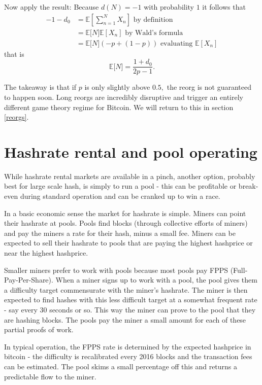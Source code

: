 \documentclass{article}%
\begin{document}
Now apply the result: Because $d(N)=-1$ with probability $1$ it follows
that
\begin{align*}
-1-d_{0}  &  =\mathbb{E}\left[  \sum_{n=1}^{N}X_{n}\right]  \text{  by
definition}\\
&  =\mathbb{E[}N\mathbb{]E}\left[  X_{n}\right]  \text{  by Wald's formula}\\
&  =\mathbb{E[}N\mathbb{]}(-p+(1-p))\text{ evaluating }\mathbb{E}\left[
X_{n}\right]
\end{align*}
that is
\begin{equation}
\mathbb{E[}N\mathbb{]=}\frac{1+d_{0}}{2p-1} .\label{wf}%
\end{equation}


The takeaway is that if $p$ is only slightly above $0.5,$ the reorg is not
guaranteed to happen soon.  Long reorgs are incredibly disruptive and trigger
an entirely different game theory regime for Bitcoin.  We will return to this
in section \ref{reorgs}.

\section{Hashrate rental and pool operating\label{erntal}}

While hashrate rental markets are available in a pinch, another option, probably best for large
scale hash, is simply to run a pool - this can be profitable or break-even
during standard operation and can be cranked up to win a race.

In a basic economic sense the market for hashrate is simple.  Miners can
point their hashrate at pools. Pools find blocks (through collective efforts
of miners) and pay the miners a rate for their hash, minus a small fee.  Miners
can be expected to sell their hashrate to pools that are paying the highest
hashprice or near the highest hashprice.

Smaller miners prefer to work with pools because most pools pay FPPS
(Full-Pay-Per-Share).  When a miner signs up to work with a pool, the pool
gives them a difficulty target commensurate with the miner's hashrate.  The miner is then expected to find hashes with this less difficult target at
a somewhat frequent rate - say every 30 seconds or so. This way the miner can
prove to the pool that they are hashing blocks.  The pools pay the miner a
small amount for each of these partial proofs of work.

In typical operation, the FPPS rate is determined by the expected hashprice
in bitcoin - the difficulty is recalibrated every 2016 blocks and the
transaction fees can be estimated. The pool skims a small percentage off this
and returns a predictable flow to the miner.
\end{document}
